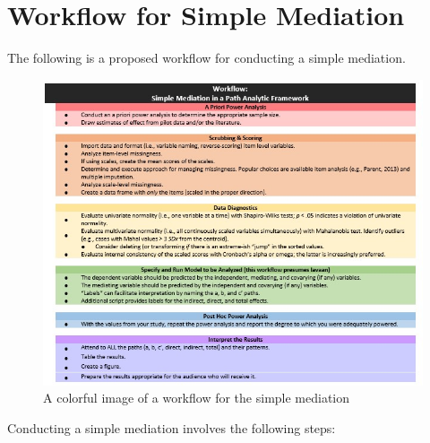 \documentclass[
  11pt,
]{book}
\begin{document}
\hypertarget{workflow-for-simple-mediation}{%
\section{Workflow for Simple Mediation}\label{workflow-for-simple-mediation}}

The following is a proposed workflow for conducting a simple mediation.

\begin{figure}
\centering
\includegraphics{images/SimpleMed/SimpMed_Workflow.jpg}
\caption{A colorful image of a workflow for the simple mediation}
\end{figure}

Conducting a simple mediation involves the following steps:
\end{document}
